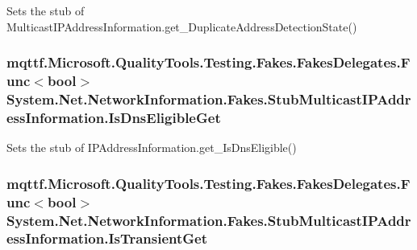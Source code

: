 Sets the stub of Multicast\-I\-P\-Address\-Information.\-get\-\_\-\-Duplicate\-Address\-Detection\-State()

\hypertarget{class_system_1_1_net_1_1_network_information_1_1_fakes_1_1_stub_multicast_i_p_address_information_a26e8dcf64f56c435514c7f6b836c2a93}{
\subsubsection[{Is\-Dns\-Eligible\-Get}]{\setlength{\rightskip}{0pt plus 5cm}mqttf.\-Microsoft.\-Quality\-Tools.\-Testing.\-Fakes.\-Fakes\-Delegates.\-Func$<$bool$>$ System.\-Net.\-Network\-Information.\-Fakes.\-Stub\-Multicast\-I\-P\-Address\-Information.\-Is\-Dns\-Eligible\-Get}}\label{class_system_1_1_net_1_1_network_information_1_1_fakes_1_1_stub_multicast_i_p_address_information_a26e8dcf64f56c435514c7f6b836c2a93}


Sets the stub of I\-P\-Address\-Information.\-get\-\_\-\-Is\-Dns\-Eligible()

\hypertarget{class_system_1_1_net_1_1_network_information_1_1_fakes_1_1_stub_multicast_i_p_address_information_a19669a4a746f4888c71ca2fb47b4e53f}{
\subsubsection[{Is\-Transient\-Get}]{\setlength{\rightskip}{0pt plus 5cm}mqttf.\-Microsoft.\-Quality\-Tools.\-Testing.\-Fakes.\-Fakes\-Delegates.\-Func$<$bool$>$ System.\-Net.\-Network\-Information.\-Fakes.\-Stub\-Multicast\-I\-P\-Address\-Information.\-Is\-Transient\-Get}}\label{class_system_1_1_net_1_1_network_information_1_1_fakes_1_1_stub_multicast_i_p_address_information_a19669a4a746f4888c71ca2fb47b4e53f}


